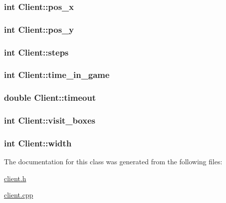 \hypertarget{classClient_a041ca02ff50a6544895c2e1013d29322}{
\subsubsection[{pos\-\_\-x}]{\setlength{\rightskip}{0pt plus 5cm}int Client\-::pos\-\_\-x}}\label{classClient_a041ca02ff50a6544895c2e1013d29322}
\hypertarget{classClient_a1bf641e425b42c642a8be4d289a49229}{
\subsubsection[{pos\-\_\-y}]{\setlength{\rightskip}{0pt plus 5cm}int Client\-::pos\-\_\-y}}\label{classClient_a1bf641e425b42c642a8be4d289a49229}
\hypertarget{classClient_a60ac9a77128bfbcff9ae1dc7564fb441}{
\subsubsection[{steps}]{\setlength{\rightskip}{0pt plus 5cm}int Client\-::steps}}\label{classClient_a60ac9a77128bfbcff9ae1dc7564fb441}
\hypertarget{classClient_a8aa8ad037b45ef85ddc9d0b36bbb42b4}{
\subsubsection[{time\-\_\-in\-\_\-game}]{\setlength{\rightskip}{0pt plus 5cm}int Client\-::time\-\_\-in\-\_\-game}}\label{classClient_a8aa8ad037b45ef85ddc9d0b36bbb42b4}
\hypertarget{classClient_a37ec3a1f75d0ddcf25354b2bc552a039}{
\subsubsection[{timeout}]{\setlength{\rightskip}{0pt plus 5cm}double Client\-::timeout}}\label{classClient_a37ec3a1f75d0ddcf25354b2bc552a039}
\hypertarget{classClient_a70083e906d35591bd5e57612ce7a5786}{
\subsubsection[{visit\-\_\-boxes}]{\setlength{\rightskip}{0pt plus 5cm}int Client\-::visit\-\_\-boxes}}\label{classClient_a70083e906d35591bd5e57612ce7a5786}
\hypertarget{classClient_aded73ce1e4c2d6a1f05c180956b85966}{
\subsubsection[{width}]{\setlength{\rightskip}{0pt plus 5cm}int Client\-::width}}\label{classClient_aded73ce1e4c2d6a1f05c180956b85966}


The documentation for this class was generated from the following files\-:\begin{DoxyCompactItemize}
\item 
\hyperlink{client_8h}{client.\-h}\item 
\hyperlink{client_8cpp}{client.\-cpp}\end{DoxyCompactItemize}
